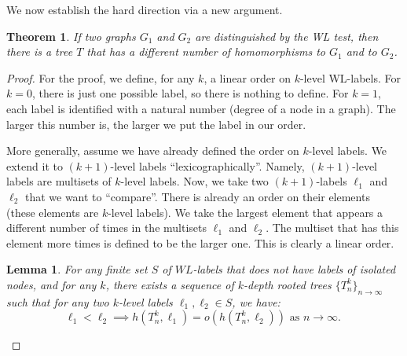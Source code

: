 \documentclass{article}
\newtheorem{theorem}{Theorem}
\newtheorem{lemma}{Lemma}
\newtheorem{remark}{Remark}
\begin{document}
We now establish the hard direction via a new argument.

\begin{theorem}
    If two graphs $G_1$ and $G_2$ are distinguished by the WL test, then there is a tree $T$ that has a different number of homomorphisms to $G_1$ and to $G_2$.
\end{theorem}
\begin{proof}




    For the proof, we define, for any $k$, a linear order on $k$-level WL-labels. For $k = 0$, there is just one possible label, so there is nothing to define. For $k = 1$, each label is identified with a natural number (degree of a node in a graph). The larger this number is, the larger we put the label in our order.

    More generally, assume we have already defined the order on $k$-level labels. We extend it to $(k+1)$-level labels ``lexicographically''. Namely, $(k+1)$-level labels are multisets of $k$-level labels. Now, we take two $(k+1)$-labels $\ell_1$ and $\ell_2$ that we want to ``compare''. There is already an order on their elements (these elements are $k$-level labels). We take the largest element that appears a different number of times in the multisets $\ell_1$ and $\ell_2$. The multiset that has this element more times is defined to be the larger one. This is clearly a linear order.


\begin{lemma}
\label{lem_dom}
    For any finite set $S$ of $WL$-labels that does not have labels of isolated nodes, and for any $k$, there exists  a sequence of $k$-depth rooted trees $\{T^k_n\}_{n\to\infty}$ such that for any two $k$-level labels $\ell_1, \ell_2\in S$, we have:
     \begin{equation}
     \label{eq_order}
         \ell_1 < \ell_2 \implies h(T^k_n, \ell_1) = o(h(T^k_n, \ell_2)) \text{ as } n\to\infty.\
     \end{equation}
\end{lemma}




\end{proof}
\end{document}

